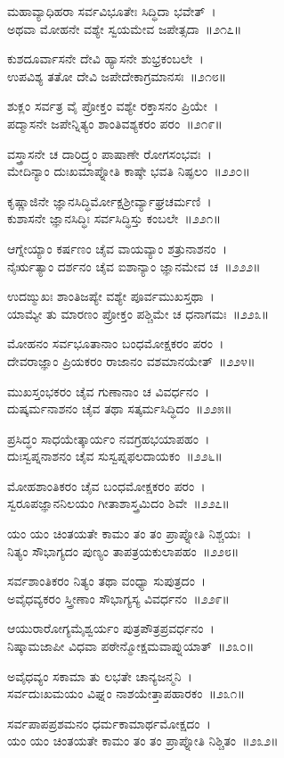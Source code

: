 ಮಹಾವ್ಯಾಧಿಹರಾ ಸರ್ವವಿಭೂತೇಃ ಸಿದ್ಧಿದಾ ಭವೇತ್~।\\
ಅಥವಾ ಮೋಹನೇ ವಶ್ಯೇ ಸ್ವಯಮೇವ ಜಪೇತ್ಸದಾ~॥೨೧೭॥

ಕುಶದೂರ್ವಾಸನೇ ದೇವಿ ಹ್ಯಾಸನೇ ಶುಭ್ರಕಂಬಲೇ~।\\
ಉಪವಿಶ್ಯ ತತೋ ದೇವಿ ಜಪೇದೇಕಾಗ್ರಮಾನಸಃ~॥೨೧೮॥

ಶುಕ್ಲಂ ಸರ್ವತ್ರ ವೈ ಪ್ರೋಕ್ತಂ ವಶ್ಯೇ ರಕ್ತಾಸನಂ ಪ್ರಿಯೇ~।\\
ಪದ್ಮಾಸನೇ ಜಪೇನ್ನಿತ್ಯಂ ಶಾಂತಿವಶ್ಯಕರಂ ಪರಂ~॥೨೧೯॥

ವಸ್ತ್ರಾಸನೇ ಚ ದಾರಿದ್ರ್ಯಂ ಪಾಷಾಣೇ ರೋಗಸಂಭವಃ~।\\
ಮೇದಿನ್ಯಾಂ ದುಃಖಮಾಪ್ನೋತಿ ಕಾಷ್ಠೇ ಭವತಿ ನಿಷ್ಫಲಂ~॥೨೨೦॥

ಕೃಷ್ಣಾಜಿನೇ ಜ್ಞಾನಸಿದ್ಧಿರ್ಮೋಕ್ಷಶ್ರೀರ್ವ್ಯಾಘ್ರಚರ್ಮಣಿ~।\\
ಕುಶಾಸನೇ ಜ್ಞಾನಸಿದ್ಧಿಃ ಸರ್ವಸಿದ್ಧಿಸ್ತು ಕಂಬಲೇ~॥೨೨೧॥

ಆಗ್ನೇಯ್ಯಾಂ ಕರ್ಷಣಂ ಚೈವ ವಾಯವ್ಯಾಂ ಶತ್ರುನಾಶನಂ~।\\
ನೈರ್ಋತ್ಯಾಂ ದರ್ಶನಂ ಚೈವ ಐಶಾನ್ಯಾಂ ಜ್ಞಾನಮೇವ ಚ~॥೨೨೨॥

ಉದಙ್ಮುಖಃ ಶಾಂತಿಜಪ್ಯೇ ವಶ್ಯೇ ಪೂರ್ವಮುಖಸ್ತಥಾ~।\\
ಯಾಮ್ಯೇ ತು ಮಾರಣಂ ಪ್ರೋಕ್ತಂ ಪಶ್ಚಿಮೇ ಚ ಧನಾಗಮಃ~॥೨೨೩॥

ಮೋಹನಂ ಸರ್ವಭೂತಾನಾಂ ಬಂಧಮೋಕ್ಷಕರಂ ಪರಂ~।\\
ದೇವರಾಜ್ಞಾಂ ಪ್ರಿಯಕರಂ ರಾಜಾನಂ ವಶಮಾನಯೇತ್~॥೨೨೪॥

ಮುಖಸ್ತಂಭಕರಂ ಚೈವ ಗುಣಾನಾಂ ಚ ವಿವರ್ಧನಂ~।\\
ದುಷ್ಕರ್ಮನಾಶನಂ ಚೈವ ತಥಾ ಸತ್ಕರ್ಮಸಿದ್ಧಿದಂ~॥೨೨೫॥

ಪ್ರಸಿದ್ಧಂ ಸಾಧಯೇತ್ಕಾರ್ಯಂ ನವಗ್ರಹಭಯಾಪಹಂ~।\\
ದುಃಸ್ವಪ್ನನಾಶನಂ ಚೈವ ಸುಸ್ವಪ್ನಫಲದಾಯಕಂ~॥೨೨೬॥

ಮೋಹಶಾಂತಿಕರಂ ಚೈವ ಬಂಧಮೋಕ್ಷಕರಂ ಪರಂ~।\\
ಸ್ವರೂಪಜ್ಞಾನನಿಲಯಂ ಗೀತಾಶಾಸ್ತ್ರಮಿದಂ ಶಿವೇ~॥೨೨೭॥

ಯಂ ಯಂ ಚಿಂತಯತೇ ಕಾಮಂ ತಂ ತಂ ಪ್ರಾಪ್ನೋತಿ ನಿಶ್ಚಯಃ~।\\
ನಿತ್ಯಂ ಸೌಭಾಗ್ಯದಂ ಪುಣ್ಯಂ ತಾಪತ್ರಯಕುಲಾಪಹಂ~॥೨೨೮॥

ಸರ್ವಶಾಂತಿಕರಂ ನಿತ್ಯಂ ತಥಾ ವಂಧ್ಯಾ ಸುಪುತ್ರದಂ~।\\
ಅವೈಧವ್ಯಕರಂ ಸ್ತ್ರೀಣಾಂ ಸೌಭಾಗ್ಯಸ್ಯ ವಿವರ್ಧನಂ~॥೨೨೯॥

ಆಯುರಾರೋಗ್ಯಮೈಶ್ವರ್ಯಂ ಪುತ್ರಪೌತ್ರಪ್ರವರ್ಧನಂ~।\\
ನಿಷ್ಕಾಮಜಾಪೀ ವಿಧವಾ ಪಠೇನ್ಮೋಕ್ಷಮವಾಪ್ನುಯಾತ್~॥೨೩೦॥

ಅವೈಧವ್ಯಂ ಸಕಾಮಾ ತು ಲಭತೇ ಚಾನ್ಯಜನ್ಮನಿ~।\\
ಸರ್ವದುಃಖಮಯಂ ವಿಘ್ನಂ ನಾಶಯೇತ್ತಾಪಹಾರಕಂ~॥೨೩೧॥

ಸರ್ವಪಾಪಪ್ರಶಮನಂ ಧರ್ಮಕಾಮಾರ್ಥಮೋಕ್ಷದಂ~।\\
ಯಂ ಯಂ ಚಿಂತಯತೇ ಕಾಮಂ ತಂ ತಂ ಪ್ರಾಪ್ನೋತಿ ನಿಶ್ಚಿತಂ~॥೨೩೨॥

